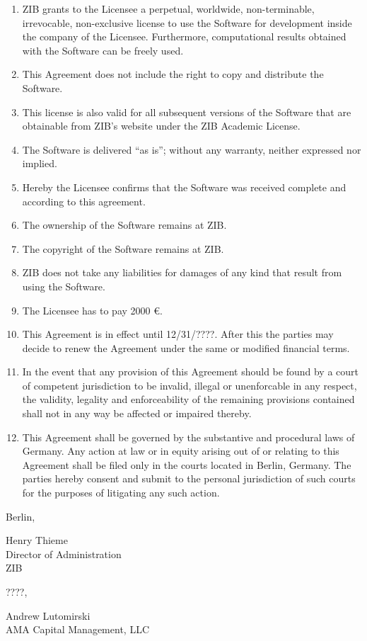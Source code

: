 \documentclass[12pt,a4paper]{article}
\begin{document}
\begin{enumerate}
\item ZIB grants to the Licensee a perpetual, worldwide, non-terminable,
  irrevocable, non-exclusive license to use the Software for development
  inside the company of the Licensee. Furthermore, computational results
  obtained with the Software can be freely used.

\item This Agreement does not include the right to copy and distribute the
  Software.

\item This license is also valid for all subsequent versions of the
  Software that are obtainable from ZIB's website under the
  ZIB Academic License.

\item The Software is delivered ``as is'';
   without any warranty, neither expressed nor implied.

\item Hereby the Licensee confirms that the Software was received
  complete and according to this agreement.

\item The ownership of the Software remains at ZIB.

\item The copyright of the Software remains at ZIB.

\item ZIB does not take any liabilities for damages of any kind that
  result from using the Software.

\item The Licensee has to pay 2000 \euro{}.

\item This Agreement is in effect until 12/31/????. After this the parties
  may decide to renew the Agreement under the same or modified financial
  terms.

\item In the event that any provision of this Agreement should be
  found by a court of competent jurisdiction to be invalid, illegal or
  unenforcable in any respect, the validity, legality and
  enforceability of the remaining provisions contained shall not in
  any way be affected or impaired thereby.

\item This Agreement shall be governed by the substantive and
  procedural laws of Germany. Any action at law or in equity arising
  out of or relating to this Agreement shall be filed only in the
  courts located in Berlin, Germany. The parties hereby consent and
  submit to the personal jurisdiction of such courts for the purposes
  of litigating any such action.

\end{enumerate}

\bigskip
\begin{minipage}[t]{0.45\textwidth}
Berlin, \underline{\hspace{4cm}}
\bigskip

Henry Thieme\\
Director of Administration\\
ZIB
\end{minipage}
\hfill
\begin{minipage}[t]{0.45\textwidth}
????, \underline{\hspace{3cm}}
\bigskip

Andrew Lutomirski\\
AMA Capital Management, LLC
\end{minipage}
\end{document}
